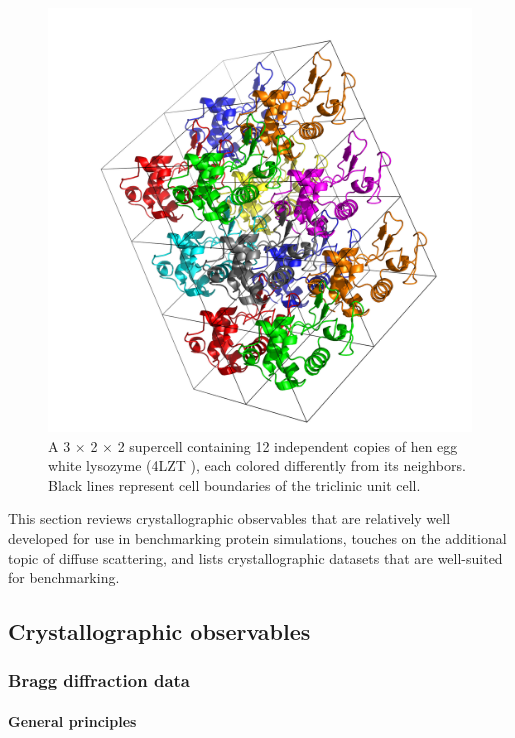 \documentclass[9pt,review]{livecoms}
\begin{document}
\begin{figure}[t]
    \centering
    \includegraphics[width=\linewidth]{paper/figures/4lzt-supercell.png}
    \caption{A 3 $\times$ 2 $\times$ 2 supercell containing 12 independent copies of hen egg white lysozyme (4LZT \cite{walsh_refinement_1998}), each colored differently from its neighbors.
    Black lines represent cell boundaries of the triclinic unit cell.}
    \label{fig:supercell}
\end{figure}

This section reviews crystallographic observables that are relatively well developed for use in benchmarking protein simulations, touches on the additional topic of diffuse scattering, and lists crystallographic datasets that are well-suited for benchmarking.

\subsection{Crystallographic observables}
\label{sub:xtal_obs}

\subsubsection{Bragg diffraction data}
\label{sub2:bragg}

\paragraph{General principles}
\end{document}
